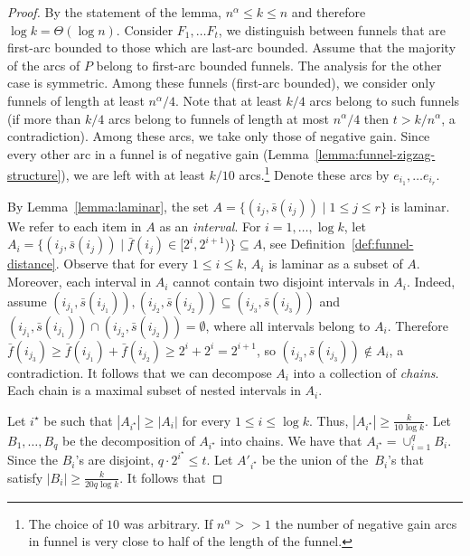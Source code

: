 \documentclass[11pt]{article}
\begin{document}
\begin{proof}
     By the statement of the lemma, $n^\alpha \le k \le n$ and therefore $\log k = \Theta(\log n)$. Consider $F_1,\ldots F_t$, we distinguish between funnels that are first-arc bounded to those which are last-arc bounded. Assume that the majority of the arcs of $P$ belong to first-arc bounded funnels. The analysis for the other case is symmetric. Among these funnels (first-arc bounded), we consider only funnels of length at least $n^\alpha/4$. Note that at least $k/4$ arcs belong to such funnels (if more than $k/4$ arcs belong to funnels of length at most $n^\alpha/4$ then $t > k / n^\alpha $, a contradiction). Among these arcs, we take only those of negative gain. Since every other arc in a funnel is of negative gain (Lemma~\ref{lemma:funnel-zigzag-structure}), we are left with at least $k/10$ arcs.\footnote{The choice of $10$ was arbitrary. If $n^\alpha >> 1$ the number of negative gain arcs in funnel is very close to half of the length of the funnel.} Denote these arcs by $e_{i_1},\ldots e_{i_r}$.
    
    By Lemma~\ref{lemma:laminar}, the set $A=\{(i_j, \bar{s}(i_j)) \mid 1\le j \le r \}$ is laminar. We refer to each item in $A$ as an \emph{interval}. For $i=1,\ldots, \log k$, let $A_i = \{(i_j,\bar{s}(i_j)) \mid \bar{f}(i_j) \in  [2^i, 2^{i+1}) \}\subseteq A $, see Definition~\ref{def:funnel-distance}.  Observe that for every $1\le i \le k$, $A_{i}$ is laminar as a subset of $A$. Moreover, each interval in $A_{i}$ cannot contain two disjoint intervals in $A_i$. Indeed,  assume $(i_{j_1},\bar{s}(i_{j_1})), (i_{j_2},\bar{s}(i_{j_2})) \subseteq (i_{j_3},\bar{s}(i_{j_3}))$ and $(i_{j_1},\bar{s}(i_{j_1})) \cap (i_{j_2},\bar{s}(i_{j_2})) = \emptyset$, where all intervals belong to $A_{i}$. Therefore $\bar{f}(i_{j_3}) \ge \bar{f}(i_{j_1}) + \bar{f}(i_{j_2}) \ge 2^{i} + 2^{i} = 2^{i+1}$, so $(i_{j_3},\bar{s}(i_{j_3})) \notin A_{i}$, a contradiction. It follows that we can decompose $A_i$ into a collection of \emph{chains}. Each chain is a maximal subset of nested intervals in $A_i$.
    
    
    
    Let $i^\star$ be such that $|A_{i^\star}| \ge |A_i|$ for every $1\le i \le \log k$. Thus, $|A_{i^\star}|\ge \frac{k}{10 \log{k}}$. Let $B_1,\ldots, B_q$ be the decomposition of  $A_{i^\star} $ into chains. We have that $A_{i^\star}= \cup_{i=1}^{q} B_i$. Since the $B_i$'s are disjoint, $q\cdot 2^{i^\star} \le t$.  Let $A'_{i^\star}$ be the union of the~$B_i$'s that satisfy $|B_i| \ge \frac{k}{20q \log  k}$. It follows that


\end{proof}
\end{document}
